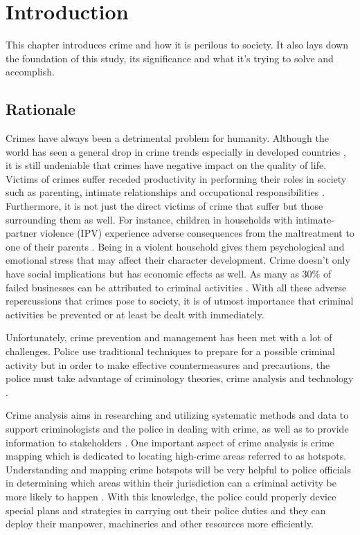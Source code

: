 \section{Introduction}
    This chapter introduces crime and how it is perilous to society. It also lays down the foundation of this study, its significance and what it's trying to solve and accomplish.
\subsection{Rationale}

    Crimes have always been a detrimental problem for humanity. Although the world has seen a general drop in crime trends especially in developed countries \cite{dijk2007criminal}, it is still undeniable that crimes have negative impact on the quality of life. Victims of crimes suffer receded productivity in performing their roles in society such as parenting, intimate relationships and occupational responsibilities \cite{hanson2010impact}. Furthermore, it is not just the direct victims of crime that suffer but those surrounding them as well. For instance, children in households with intimate-partner violence (IPV) experience adverse consequences from the maltreatment to one of their parents \cite{casanueva2008quality}. Being in a violent household gives them psychological and emotional stress that may affect their character development. Crime doesn’t only have social implications but has economic effects as well. As many as 30\% of failed businesses can be attributed to criminal activities \cite{bressler2009impact}. With all these adverse repercussions that crimes pose to society, it is of utmost importance that criminal activities be prevented or at least be dealt with immediately.

    Unfortunately, crime prevention and management has been met with a lot of challenges. Police use traditional techniques to prepare for a possible criminal activity but in order to make effective countermeasures and precautions, the police must take advantage of criminology theories, crime analysis and technology \cite{polat2007spatio}.

    Crime analysis aims in researching and utilizing systematic methods and data to support criminologists and the police in dealing with crime, as well as to provide information to stakeholders \cite{santos2012crime}. One important aspect of crime analysis is crime mapping which is dedicated to locating high-crime areas referred to as hotspots. Understanding and mapping crime hotspots will be very helpful to police officials in determining which areas within their jurisdiction can a criminal activity be more likely to happen \cite{eck2005mapping}. With this knowledge, the police could properly device special plans and strategies in carrying out their police duties and they can deploy their manpower, machineries and other resources more efficiently.

